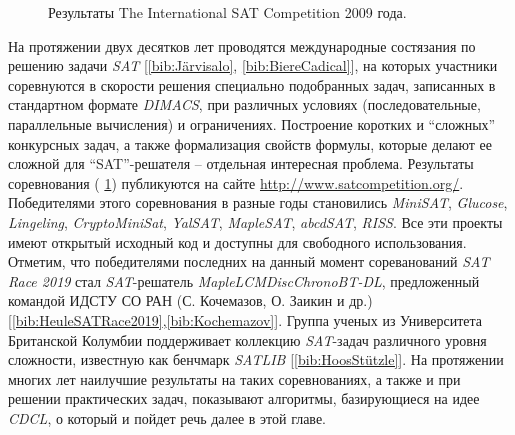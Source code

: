 \begin{figure}[h]
\centering
\captionsetup{justification=centering}
\caption{Результаты The International SAT Competition 2009 года.}
\label{chapter1:fig:satcomp}
\end{figure}

На протяжении двух десятков лет проводятся международные состязания по решению задачи \textit{SAT} 
[\ref{bib:Järvisalo}, \ref{bib:BiereCadical}], на которых участники соревнуются в скорости решения специально подобранных задач, записанных в стандартном формате \textit{DIMACS}, при различных условиях (последовательные, параллельные вычисления) и ограничениях. Построение коротких и \enquote{сложных} конкурсных задач, а также формализация свойств формулы, которые делают ее сложной для \enquote{SAT}-решателя – отдельная интересная проблема. Результаты соревнования 
(\figurename{ \ref{chapter1:fig:satcomp}}) публикуются на сайте \url{http://www.satcompetition.org/}. Победителями этого соревнования в разные годы становились \textit{MiniSAT}, \textit{Glucose}, \textit{Lingeling}, \textit{CryptoMiniSat}, \textit{YalSAT}, \textit{MapleSAT}, \textit{abcdSAT}, \textit{RISS}. Все эти проекты имеют открытый исходный код и доступны для свободного использования. Отметим, что победителями последних на данный момент сореванований \textit{SAT Race 2019} стал \textit{SAT}-решатель \textit{MapleLCMDiscChronoBT-DL}, предложенный
командой ИДСТУ СО РАН (С. Кочемазов, О. Заикин и др.) [\ref{bib:HeuleSATRace2019},\ref{bib:Kochemazov}]. 
Группа ученых из Университета Британской Колумбии поддерживает коллекцию \textit{SAT}-задач различного уровня сложности, известную как бенчмарк \textit{SATLIB} 
[\ref{bib:HoosStützle}]. На протяжении многих лет наилучшие результаты на таких соревнованиях, а также и при решении практических задач, показывают алгоритмы, базирующиеся на идее \textit{CDCL}, о который и пойдет речь далее в этой главе.

